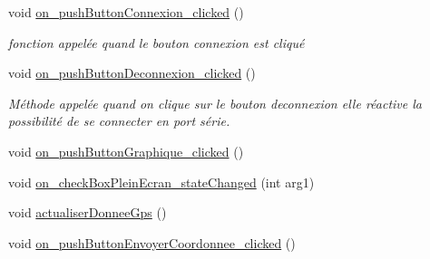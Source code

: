 \begin{DoxyCompactItemize}
void \hyperlink{class_ihm_abf61dda1820e5632485de93983c40196}{on\+\_\+push\+Button\+Connexion\+\_\+clicked} ()
\begin{DoxyCompactList}\small\item\em fonction appelée quand le bouton connexion est cliqué \end{DoxyCompactList}\item 
void \hyperlink{class_ihm_ad176c58fb3c583286544f010ac006b66}{on\+\_\+push\+Button\+Deconnexion\+\_\+clicked} ()
\begin{DoxyCompactList}\small\item\em Méthode appelée quand on clique sur le bouton deconnexion elle réactive la possibilité de se connecter en port série. \end{DoxyCompactList}\item 
void \hyperlink{class_ihm_a132bd248057d7278c6841788961b5898}{on\+\_\+push\+Button\+Graphique\+\_\+clicked} ()
\item 
void \hyperlink{class_ihm_a8ee57b456ba85c2667ebf298f06d60c5}{on\+\_\+check\+Box\+Plein\+Ecran\+\_\+state\+Changed} (int arg1)
\item 
void \hyperlink{class_ihm_a3ca276093d65c42a5fc5a87cbca1972a}{actualiser\+Donnee\+Gps} ()
\item 
void \hyperlink{class_ihm_a850d1c97ed5fe5ba3cf3aa85d81872cd}{on\+\_\+push\+Button\+Envoyer\+Coordonnee\+\_\+clicked} ()
\end{DoxyCompactItemize}
